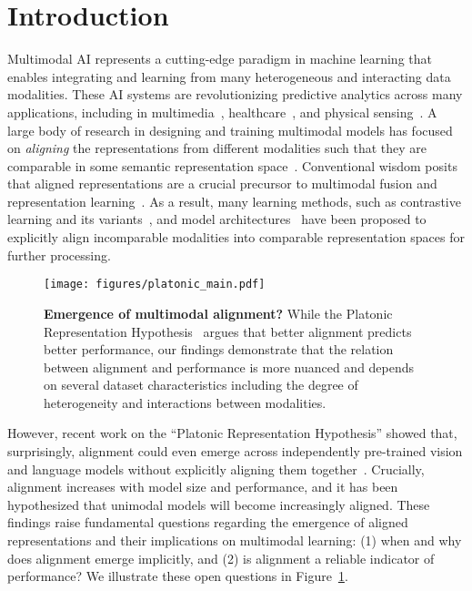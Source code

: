 \vspace{-4mm}
\section{Introduction}

Multimodal AI represents a cutting-edge paradigm in machine learning that enables integrating and learning from many heterogeneous and interacting data modalities. These AI systems are revolutionizing predictive analytics across many applications, including in multimedia~\citep{alayrac2022flamingo,sun2019videobert,ramesh2021zero,singer2022make}, healthcare~\citep{cai2019survey,muhammad2021comprehensive}, and physical sensing~\citep{kirchner2019embedded,lee2019making,xiao2020multimodal}. A large body of research in designing and training multimodal models has focused on \textit{aligning} the representations from different modalities such that they are comparable in some semantic representation space~\citep{baltruvsaitis2018multimodal,liang2024foundations}. Conventional wisdom posits that aligned representations are a crucial precursor to multimodal fusion and representation learning~\citep{li2021align}. As a result, many learning methods, such as contrastive learning and its variants~\cite{frome2013devise,jia2021scaling,radford2021learning}, and model architectures~\citep{bertinetto2016fully,lenc_understanding_2019,bansal_revisiting_2021, csiszarik_similarity_2021} have been proposed to explicitly align incomparable modalities into comparable representation spaces for further processing.

\begin{figure}
    \centering
    \vspace{-6mm}
    \texttt{[image: figures/platonic\_main.pdf]}
    \vspace{-8mm}
    \caption{\textbf{Emergence of multimodal alignment?} While the Platonic Representation Hypothesis~\citep{huh_platonic_2024} argues that better alignment predicts better performance, our findings demonstrate that the relation between alignment and performance is more nuanced and depends on several dataset characteristics including the degree of heterogeneity and interactions between modalities.}
    \vspace{-4mm}
    \label{fig:intro}
\end{figure} 

However, recent work on the ``Platonic Representation Hypothesis'' showed that, surprisingly, alignment could even emerge across independently pre-trained vision and language models without explicitly aligning them together~\cite{huh_platonic_2024}. Crucially, alignment increases with model size and performance, and it has been hypothesized that unimodal models will become increasingly aligned. These findings raise fundamental questions regarding the emergence of aligned representations and their implications on multimodal learning: (1) when and why does alignment emerge implicitly, and (2) is alignment a reliable indicator of performance? We illustrate these open questions in Figure~\ref{fig:intro}.

